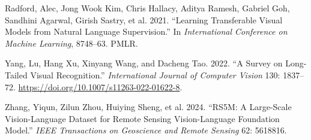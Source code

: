 \documentclass[
  a4paper,
]{article}
\newlength{\cslhangindent}
\newenvironment{CSLReferences}[2] %
 {\begin{list}{}{%
  \setlength{\itemindent}{0pt}
  \setlength{\leftmargin}{0pt}
  \setlength{\parsep}{0pt}
  \ifodd #1
   \setlength{\leftmargin}{\cslhangindent}
   \setlength{\itemindent}{-1\cslhangindent}
  \fi
  \setlength{\itemsep}{#2\baselineskip}}}
 {\end{list}}
\begin{document}
\begin{CSLReferences}{1}{0}
Radford, Alec, Jong Wook Kim, Chris Hallacy, Aditya Ramesh, Gabriel Goh,
Sandhini Agarwal, Girish Sastry, et al. 2021. {``Learning Transferable
Visual Models from Natural Language Supervision.''} In
\emph{International Conference on Machine Learning}, 8748--63. PMLR.

Yang, Lu, Hang Xu, Xinyang Wang, and Dacheng Tao. 2022. {``A Survey on
Long-Tailed Visual Recognition.''} \emph{International Journal of
Computer Vision} 130: 1837--72.
\url{https://doi.org/10.1007/s11263-022-01622-8}.

Zhang, Yiqun, Zilun Zhou, Huiying Sheng, et al. 2024. {``{RS5M}: A
Large-Scale Vision-Language Dataset for Remote Sensing Vision-Language
Foundation Model.''} \emph{IEEE Transactions on Geoscience and Remote
Sensing} 62: 5618816.

\end{CSLReferences}
\end{document}

